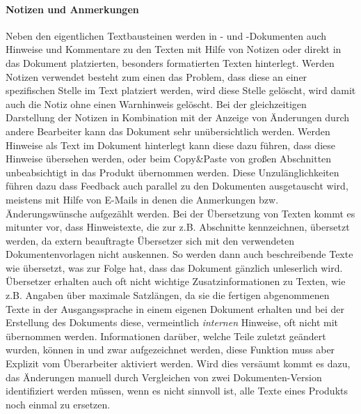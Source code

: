 \paragraph{Notizen und Anmerkungen} Neben den eigentlichen Textbausteinen werden in - und -Dokumenten auch Hinweise und Kommentare zu den Texten mit Hilfe von Notizen oder direkt in das Dokument platzierten, besonders formatierten Texten hinterlegt. Werden Notizen verwendet besteht zum einen das Problem, dass diese an einer spezifischen Stelle im Text platziert werden, wird diese Stelle gelöscht, wird damit auch die Notiz ohne einen Warnhinweis gelöscht. Bei der gleichzeitigen Darstellung der Notizen in Kombination mit der Anzeige von Änderungen durch andere Bearbeiter kann das Dokument sehr unübersichtlich werden. Werden Hinweise als Text im Dokument hinterlegt kann diese dazu führen, dass diese Hinweise übersehen werden, oder beim Copy\&Paste von großen Abschnitten unbeabsichtigt in das Produkt übernommen  werden. Diese Unzulänglichkeiten führen dazu dass Feedback auch parallel zu den Dokumenten ausgetauscht wird, meistens mit Hilfe von E-Mails in denen die Anmerkungen bzw. Änderungswünsche aufgezählt werden. Bei der Übersetzung von Texten kommt es mitunter vor, dass Hinweistexte, die zur z.B. Abschnitte kennzeichnen, übersetzt werden, da extern beauftragte Übersetzer sich mit den verwendeten Dokumentenvorlagen nicht auskennen. So werden dann auch beschreibende Texte wie  übersetzt, was zur Folge hat, dass das Dokument gänzlich unleserlich wird. Übersetzer erhalten auch oft nicht wichtige Zusatzinformationen zu Texten, wie z.B. Angaben über maximale Satzlängen, da sie die fertigen abgenommenen Texte in der Ausgangssprache in einem eigenen Dokument erhalten und bei der Erstellung des Dokuments diese, vermeintlich \emph{internen} Hinweise, oft nicht mit übernommen werden.
Informationen darüber, welche Teile zuletzt geändert wurden, können in  und  zwar aufgezeichnet werden, diese Funktion muss aber Explizit vom Überarbeiter aktiviert werden. Wird dies versäumt kommt es dazu, das Änderungen manuell durch Vergleichen von zwei Dokumenten-Version identifiziert werden müssen, wenn es nicht sinnvoll ist, alle Texte eines Produkts noch einmal zu ersetzen.

